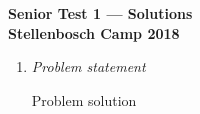 \documentclass{article}
\begin{document}
\begin{center}
\textbf{\Large Senior Test 1 --- Solutions}
\\ \vspace{1em}
\textbf{\large Stellenbosch Camp 2018}
\end{center}

\begin{enumerate}[1.]

\item %
\textit{Problem statement}

Problem solution

\end{enumerate}
\end{document}
